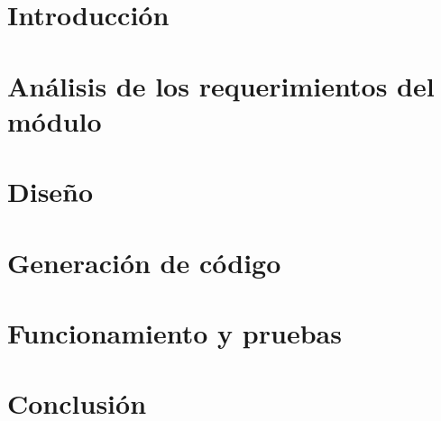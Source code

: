 \documentclass{article}
\begin{document}
 
\tableofcontents

\clearpage
 
\section{Introducción}

\clearpage

\section{Análisis de los requerimientos del módulo}

\clearpage

\section{Diseño}

\clearpage

\section{Generación de código}

\clearpage

\section{Funcionamiento y pruebas}

\clearpage

\section{Conclusión}

\clearpage

\printindex
\end{document}
